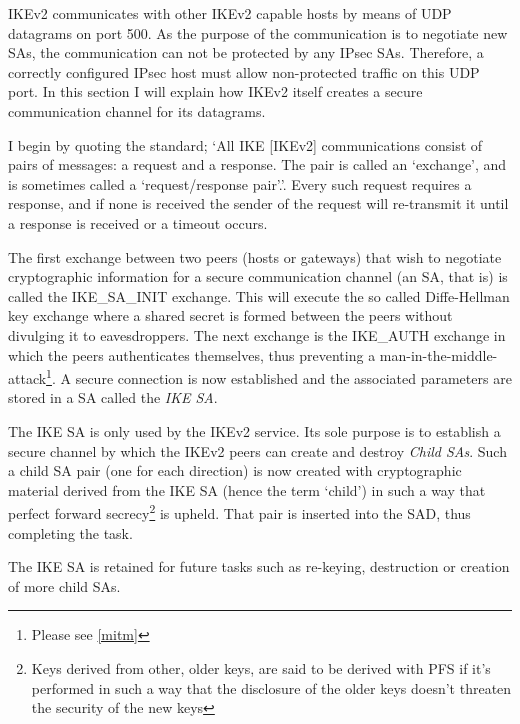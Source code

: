 \documentclass[final,a4paper,twoside,11pt,onecolumn]{report}
\begin{document}
IKEv2 communicates with other IKEv2 capable hosts by means of UDP datagrams on port 500. As the purpose of the communication is to negotiate new SAs, the communication can not be protected by any IPsec SAs. Therefore, a correctly configured IPsec host must allow non-protected traffic on this UDP port. In this section I will explain how IKEv2 itself creates a secure communication channel for its datagrams.

I begin by quoting the standard; `All IKE [IKEv2] communications consist of pairs of messages: a request and a response. The pair is called an `exchange', and is sometimes called a `request/response pair'.'\citep[p.5]{rfc5996}. Every such request requires a response, and if none is received the sender of the request will re-transmit it until a response is received or a timeout occurs. 

The first exchange between two peers (hosts or gateways) that wish to negotiate cryptographic information for a secure communication channel (an SA, that is) is called the IKE\_SA\_INIT exchange. This will execute the so called Diffe-Hellman key exchange where a shared secret is formed between the peers without divulging it to eavesdroppers. The next exchange is the IKE\_AUTH exchange in which the peers authenticates themselves, thus preventing a man-in-the-middle-attack\footnote{Please see \ref{mitm}}. A secure connection is now established and the associated parameters are stored in a SA called the \emph{IKE SA}.

The IKE SA is only used by the IKEv2 service. Its sole purpose is to establish a secure channel by which the IKEv2 peers can create and destroy \emph{Child SAs}. Such a child SA pair (one for each direction) is now created with cryptographic material derived from the IKE SA (hence the term `child') in such a way that perfect forward secrecy\footnote{Keys derived from other, older keys, are said to be derived with PFS if it's performed in such a way that the disclosure of the older keys doesn't threaten the security of the new keys} is upheld. That pair is inserted into the SAD, thus completing the task.

The IKE SA is retained for future tasks such as re-keying, destruction or creation of more child SAs.


\end{document}
